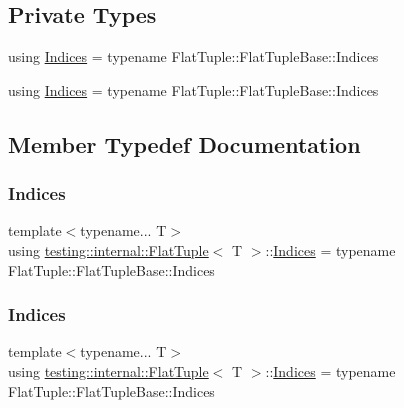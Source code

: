 \subsection*{Private Types}
\begin{DoxyCompactItemize}
\item 
using \mbox{\hyperlink{classtesting_1_1internal_1_1_flat_tuple_a004b42fc11ac1a85a9b1560fa83cdf77}{Indices}} = typename Flat\+Tuple\+::\+Flat\+Tuple\+Base\+::\+Indices
\item 
using \mbox{\hyperlink{classtesting_1_1internal_1_1_flat_tuple_a004b42fc11ac1a85a9b1560fa83cdf77}{Indices}} = typename Flat\+Tuple\+::\+Flat\+Tuple\+Base\+::\+Indices
\end{DoxyCompactItemize}


\subsection{Member Typedef Documentation}
\mbox{\label{classtesting_1_1internal_1_1_flat_tuple_a004b42fc11ac1a85a9b1560fa83cdf77}} 
\subsubsection{\texorpdfstring{Indices}{Indices}\hspace{0.1cm}{\footnotesize\ttfamily [1/2]}}
{\footnotesize\ttfamily template$<$typename... T$>$ \\
using \mbox{\hyperlink{classtesting_1_1internal_1_1_flat_tuple}{testing\+::internal\+::\+Flat\+Tuple}}$<$ T $>$\+::\mbox{\hyperlink{classtesting_1_1internal_1_1_flat_tuple_a004b42fc11ac1a85a9b1560fa83cdf77}{Indices}} =  typename Flat\+Tuple\+::\+Flat\+Tuple\+Base\+::\+Indices\hspace{0.3cm}{\ttfamily [private]}}

\mbox{\label{classtesting_1_1internal_1_1_flat_tuple_a004b42fc11ac1a85a9b1560fa83cdf77}} 
\subsubsection{\texorpdfstring{Indices}{Indices}\hspace{0.1cm}{\footnotesize\ttfamily [2/2]}}
{\footnotesize\ttfamily template$<$typename... T$>$ \\
using \mbox{\hyperlink{classtesting_1_1internal_1_1_flat_tuple}{testing\+::internal\+::\+Flat\+Tuple}}$<$ T $>$\+::\mbox{\hyperlink{classtesting_1_1internal_1_1_flat_tuple_a004b42fc11ac1a85a9b1560fa83cdf77}{Indices}} =  typename Flat\+Tuple\+::\+Flat\+Tuple\+Base\+::\+Indices\hspace{0.3cm}{\ttfamily [private]}}



